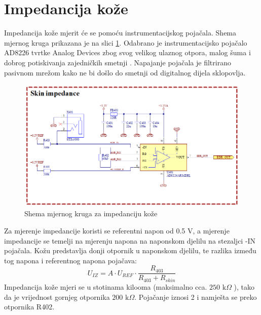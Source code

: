 \section{Impedancija kože}
Impedancija kože mjerit će se pomoću instrumentacijskog pojačala. Shema mjernog kruga prikazana je na slici \ref{slk:EDR}. Odabrano je instrumentacijsko pojačalo AD8226 tvrtke Analog Devices zbog svog velikog ulaznog otpora, malog šuma i dobrog potiskivanja zajedničkih smetnji \cite{ad:ad8226}. Napajanje pojačala je filtrirano pasivnom mrežom kako ne bi došlo do smetnji od digitalnog dijela sklopovlja.
\begin{figure}[htb]
    \centering
    \includegraphics[width=\textwidth]{Figures/EDR.png}
    \caption{Shema mjernog kruga za impedanciju kože}
    \label{slk:EDR}
\end{figure}
Za mjerenje impedancije koristi se referentni napon od 0.5 V, a mjerenje impedancije se temelji na mjerenju napona na naponskom djelilu na stezaljci -IN pojačala. Kožu predstavlja donji otpornik u naponskom djelilu, te razlika između tog napona i referentnog napona pojačava:
\begin{equation} \label{eq:EDR}
    U_{IZ}=A\cdot U_{REF}\cdot \frac{R_{403}}{R_{403}+R_{skin}}
\end{equation}
Impedancija kože mjeri se u stotinama kilooma (maksimalno cca. $250\textrm{ k}\Omega$ \cite{rskin}), tako da je vrijednost gornjeg otpornika $200\textrm{ k}\Omega$. Pojačanje iznosi 2 i namješta se preko otpornika R402.

